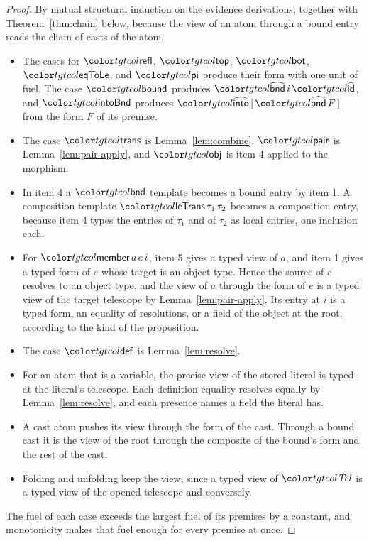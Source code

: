 \begin{proof}
By mutual structural induction on the evidence derivations, together with Theorem~\ref{thm:chain} below, because the view of an atom through a bound entry reads the chain of casts of the atom.
\begin{itemize}
\item The cases for $\ev{refl}$, $\ev{top}$, $\ev{bot}$, $\ev{eqToLe}$, and $\ev{pi}$ produce their form with one unit of fuel. The case $\ev{bound}$ produces $\form{bnd}\,i\,\form{id}$, and $\ev{intoBnd}$ produces $\form{into}\,[\,\form{bnd}\,F\,]$ from the form $F$ of its premise.
\item The case $\ev{trans}$ is Lemma~\ref{lem:combine}, $\ev{pair}$ is Lemma~\ref{lem:pair-apply}, and $\ev{obj}$ is item 4 applied to the morphism.
\item In item 4 a $\ev{bnd}$ template becomes a bound entry by item 1. A composition template $\ev{leTrans}\,\tau_1\,\tau_2$ becomes a composition entry, because item 4 types the entries of $\tau_1$ and of $\tau_2$ as local entries, one inclusion each.
\item For $\ev{member}\,a\,e\,i$, item 5 gives a typed view of $a$, and item 1 gives a typed form of $e$ whose target is an object type. Hence the source of $e$ resolves to an object type, and the view of $a$ through the form of $e$ is a typed view of the target telescope by Lemma~\ref{lem:pair-apply}. Its entry at $i$ is a typed form, an equality of resolutions, or a field of the object at the root, according to the kind of the proposition.
\item The case $\ev{def}$ is Lemma~\ref{lem:resolve}.
\item For an atom that is a variable, the precise view of the stored literal is typed at the literal's telescope. Each definition equality resolves equally by Lemma~\ref{lem:resolve}, and each presence names a field the literal has.
\item A cast atom pushes its view through the form of the cast. Through a bound cast it is the view of the root through the composite of the bound's form and the rest of the cast.
\item Folding and unfolding keep the view, since a typed view of $\tel$ is a typed view of the opened telescope and conversely.
\end{itemize}
The fuel of each case exceeds the largest fuel of its premises by a constant, and monotonicity makes that fuel enough for every premise at once.
\end{proof}


